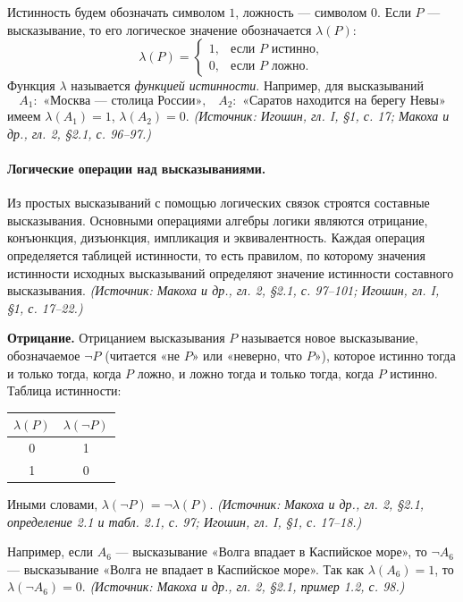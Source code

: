 \documentclass[a4paper,12pt]{article}
\begin{document}
Истинность будем обозначать символом \(1\), ложность — символом \(0\). Если \(P\) — высказывание, то его логическое значение обозначается \(\lambda(P)\):
\[
\lambda(P)=
\begin{cases}
1, & \text{если } P \text{ истинно},\\
0, & \text{если } P \text{ ложно}.
\end{cases}
\]
Функция \(\lambda\) называется \emph{функцией истинности}. Например, для высказываний
\[
A_1:\text{ «Москва — столица России»,}\quad
A_2:\text{ «Саратов находится на берегу Невы»}
\]
имеем \(\lambda(A_1)=1\), \(\lambda(A_2)=0\).
\textit{(Источник: Игошин, гл. I, §1, с. 17; Макоха и др., гл. 2, §2.1, с. 96--97.)}

\paragraph{Логические операции над высказываниями.}
Из простых высказываний с помощью логических связок строятся составные высказывания. Основными операциями алгебры логики являются отрицание, конъюнкция, дизъюнкция, импликация и эквивалентность. Каждая операция определяется таблицей истинности, то есть правилом, по которому значения истинности исходных высказываний определяют значение истинности составного высказывания.
\textit{(Источник: Макоха и др., гл. 2, §2.1, с. 97--101; Игошин, гл. I, §1, с. 17--22.)}

\textbf{Отрицание.} Отрицанием высказывания \(P\) называется новое высказывание, обозначаемое \(\neg P\) (читается «не \(P\)» или «неверно, что \(P\)»), которое истинно тогда и только тогда, когда \(P\) ложно, и ложно тогда и только тогда, когда \(P\) истинно. Таблица истинности:
\begin{center}
\begin{tabular}{c|c}
\toprule
\(\lambda(P)\) & \(\lambda(\neg P)\)\\
\midrule
0 & 1\\
1 & 0\\
\bottomrule
\end{tabular}
\end{center}
Иными словами, \(\lambda(\neg P)=\neg\lambda(P)\).
\textit{(Источник: Макоха и др., гл. 2, §2.1, определение 2.1 и табл. 2.1, с. 97; Игошин, гл. I, §1, с. 17--18.)}

Например, если \(A_6\) — высказывание «Волга впадает в Каспийское море», то \(\neg A_6\) — высказывание «Волга не впадает в Каспийское море». Так как \(\lambda(A_6)=1\), то \(\lambda(\neg A_6)=0\).
\textit{(Источник: Макоха и др., гл. 2, §2.1, пример 1.2, с. 98.)}
\end{document}

